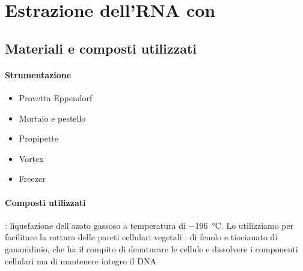 \section{Estrazione dell'RNA con \trizol}
\subsection{Materiali e composti utilizzati}
\paragraph{Strumentazione}
\begin{itemize}[person]
	\item Provetta \foreignlanguage{german}{Eppendorf}
	\item Mortaio e pestello
	\item Propipette
	\item \foreignlanguage{english}{Vortex}
	\item Freezer
\end{itemize}

\paragraph{Composti utilizzati}

\begingroup
{}
\begin{itemize}[person]
	: liquefazione dell'azoto gassoso a temperatura di \qty{-196}{\celsius}. Lo utilizziamo per facilitare la rottura delle pareti cellulari vegetali
	\itemb[\trizol]: \slz di fenolo e tiocianato di gauanidinio, che ha il compito di denaturare le cellule e dissolvere i componenti cellulari ma di mantenere integro il DNA 
	\itemb[Cloroformio]
	\itemb[Isopropanolo]
\end{itemize}
\endgroup

